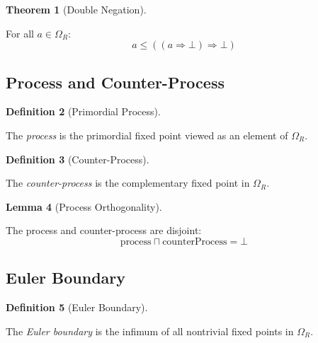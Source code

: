 \documentclass{amsart}
\theoremstyle{definition}
\newtheorem{definition}{Definition}[section]
\newtheorem{theorem}[definition]{Theorem}
\newtheorem{lemma}[definition]{Lemma}
\theoremstyle{remark}
\begin{document}
\begin{theorem}[Double Negation]
\label{thm:double-neg}
\leanok
{}

For all $a \in \Omega_R$:
\[
a \leq ((a \Rightarrow \bot) \Rightarrow \bot)
\]
\end{theorem}

\subsection{Process and Counter-Process}
\label{sec:processes}

\begin{definition}[Primordial Process]
\label{def:process}

The \emph{process} is the primordial fixed point viewed as an element of $\Omega_R$.
\end{definition}

\begin{definition}[Counter-Process]
\label{def:counter-process}

The \emph{counter-process} is the complementary fixed point in $\Omega_R$.
\end{definition}

\begin{lemma}[Process Orthogonality]
\label{lem:process-ortho}
\leanok
{}

The process and counter-process are disjoint:
\[
\text{process} \sqcap \text{counterProcess} = \bot
\]
\end{lemma}

\subsection{Euler Boundary}
\label{sec:euler-boundary}

\begin{definition}[Euler Boundary]
\label{def:euler-boundary}

The \emph{Euler boundary} is the infimum of all nontrivial fixed points in $\Omega_R$.
\end{definition}
\end{document}
